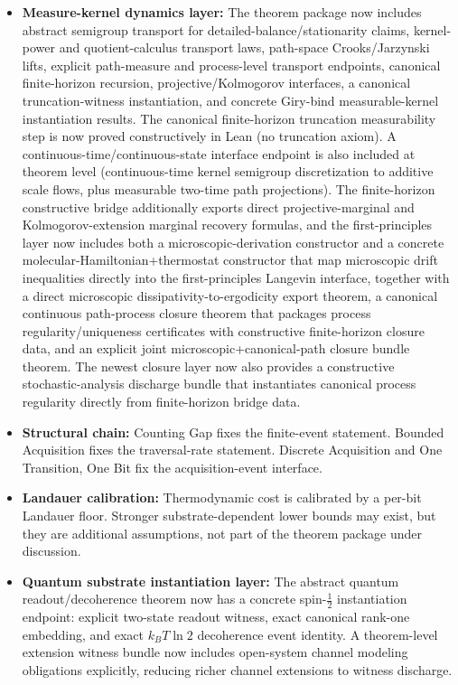 \begin{itemize}
	\item \textbf{Measure-kernel dynamics layer:} The theorem package now includes abstract semigroup transport for detailed-balance/stationarity claims, kernel-power and quotient-calculus transport laws, path-space Crooks/Jarzynski lifts, explicit path-measure and process-level transport endpoints, canonical finite-horizon recursion, projective/Kolmogorov interfaces, a canonical truncation-witness instantiation, and concrete Giry-bind measurable-kernel instantiation results. The canonical finite-horizon truncation measurability step is now proved constructively in Lean (no truncation axiom). A continuous-time/continuous-state interface endpoint is also included at theorem level (continuous-time kernel semigroup discretization to additive scale flows, plus measurable two-time path projections). The finite-horizon constructive bridge additionally exports direct projective-marginal and Kolmogorov-extension marginal recovery formulas, and the first-principles layer now includes both a microscopic-derivation constructor and a concrete molecular-Hamiltonian+thermostat constructor that map microscopic drift inequalities directly into the first-principles Langevin interface, together with a direct microscopic dissipativity-to-ergodicity export theorem, a canonical continuous path-process closure theorem that packages process regularity/uniqueness certificates with constructive finite-horizon closure data, and an explicit joint microscopic+canonical-path closure bundle theorem. The newest closure layer now also provides a constructive stochastic-analysis discharge bundle that instantiates canonical process regularity directly from finite-horizon bridge data.
	\item \textbf{Structural chain:} Counting Gap fixes the finite-event statement. Bounded Acquisition fixes the traversal-rate statement. Discrete Acquisition and One Transition, One Bit fix the acquisition-event interface.
	\item \textbf{Landauer calibration:} Thermodynamic cost is calibrated by a per-bit Landauer floor. Stronger substrate-dependent lower bounds may exist, but they are additional assumptions, not part of the theorem package under discussion.
	\item \textbf{Quantum substrate instantiation layer:} The abstract quantum readout/decoherence theorem now has a concrete spin-$\tfrac12$ instantiation endpoint: explicit two-state readout witness, exact canonical rank-one embedding, and exact $k_B T\ln 2$ decoherence event identity. A theorem-level extension witness bundle now includes open-system channel modeling obligations explicitly, reducing richer channel extensions to witness discharge.

\end{itemize}
